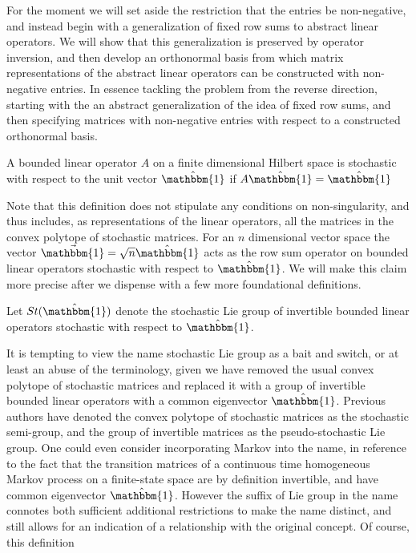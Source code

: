 For the moment we will set aside the restriction that the entries be non-negative, and
instead begin with a generalization of fixed row sums to abstract linear operators. We will
show that this generalization is preserved by operator inversion, and then develop an
orthonormal basis from which matrix representations of the abstract linear operators can be
constructed with non-negative entries. In essence tackling the problem from the reverse
direction, starting with the an abstract generalization of the idea of fixed row sums, and
then specifying matrices with non-negative entries with respect to a constructed orthonormal
basis.
\begin{definition}
	A bounded linear operator $A$ on a finite dimensional Hilbert space is stochastic with
	respect to the unit vector $\hat{\mathbbm{1}}$ if $A \hat{\mathbbm{1}} = \hat{\mathbbm{1}}$
\end{definition}
Note that this definition does not stipulate any conditions on non-singularity, and thus
includes, as representations of the linear operators, all the matrices in the convex
polytope of stochastic matrices. For an $n$ dimensional vector space the vector $\vec{\mathbbm{1}} = \sqrt{n} \hat{\mathbbm{1}}$
acts as the row sum operator on bounded linear operators stochastic with respect to $\hat{\mathbbm{1}}$. 
We will make this claim more precise after we dispense with a few more foundational
definitions.
\begin{definition}
	Let $St(\hat{\mathbbm{1}})$ denote the stochastic Lie group of invertible bounded linear
	operators stochastic with respect to $\hat{\mathbbm{1}}$.
\end{definition}
It is tempting to view the name stochastic Lie group as a bait and switch, or at least an
abuse of the terminology, given we have removed the usual convex polytope of stochastic
matrices and replaced it with a group of invertible bounded linear operators with a common
eigenvector $\hat{\mathbbm{1}}$. Previous authors have denoted the convex polytope of
stochastic matrices as the stochastic semi-group, and the group of invertible matrices as
the pseudo-stochastic Lie group. One could even consider incorporating Markov into the name,
in reference to the fact that the transition matrices of a continuous time homogeneous
Markov process on a finite-state space are by definition invertible, and have common
eigenvector $\hat{\mathbbm{1}}$. However the suffix of Lie group in the name connotes both
sufficient additional restrictions to make the name distinct, and still allows for an
indication of a relationship with the original concept. Of course, this definition
